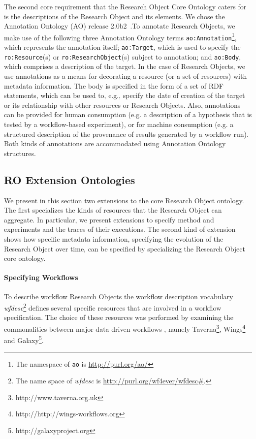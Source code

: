 The second core requirement that the Research Object Core Ontology caters for is the descriptions of the Research Object and its elements. We chose the Annotation Ontology (AO) release 2.0b2~\cite{COG11}.To annotate Research Objects, we make use of the following three Annotation Ontology terms \texttt{ao:Annotation}\footnote{The namespace of \texttt{ao} is \url{http://purl.org/ao/}}, which represents the annotation itself; \texttt{ao:Target}, which is used to specify the \texttt{ro:Resource}(s) or \texttt{ro:ResearchObject}(s) subject to annotation; and \texttt{ao:Body}, which comprises a description of the target.
In the case of Research Objects, we use annotations as a means for decorating a resource (or a set of resources) with metadata information. The body is specified in the form of a set of RDF statements, which can be used to, e.g., specify  the date of creation of the target or its relationship with other resources or Research Objects. Also, annotations can be provided for human consumption (e.g. a description of a hypothesis that is tested by a workflow-based experiment), or for machine consumption (e.g. a structured description of the provenance of results generated by a workflow run). Both kinds of annotations are accommodated using Annotation Ontology structures.

\subsection{RO Extension Ontologies}
We present in this section two  extensions to the core Research Object ontology. The first specializes the kinds of resources that the Research Object can aggregate. In particular, we present extensions to specify  method and experiments and the traces of their executions. The second kind of extension shows how specific metadata information, specifying the evolution of the Research Object over time, can be specified by specializing the Research Object core ontology.

\paragraph{Specifying Workflows}
To describe workflow Research Objects the workflow description vocabulary \textit{wfdesc}\footnote{The name space of \textit{wfdesc} is \url{http://purl.org/wf4ever/wfdesc\#}.} defines several specific resources that are involved in a workflow specification. The choice of these resources was performed by examining the commonalities between major data driven workflows \cite{TDG+07}, namely Taverna\footnote{http://www.taverna.org.uk}, Wings\footnote{http://http://wings-workflows.org} and Galaxy\footnote{http://galaxyproject.org}.

